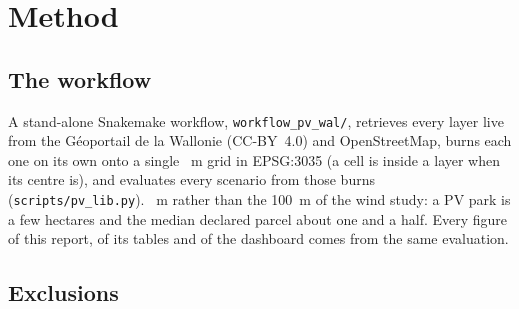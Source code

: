 \documentclass[11pt,a4paper]{article}
\begin{document}
\section{Method}\label{sec:method}

\subsection{The workflow}

A stand-alone Snakemake workflow, \texttt{workflow\_pv\_wal/}, retrieves every
layer live from the Géoportail de la Wallonie (CC-BY~4.0) and OpenStreetMap,
burns each one on its own onto a single \GridRes{}~m grid in EPSG:3035 (a cell
is inside a layer when its centre is), and evaluates every scenario from those
burns (\texttt{scripts/pv\_lib.py}). \GridRes{}~m rather than the 100~m of the
wind study: a PV park is a few hectares and the median declared parcel about
one and a half. Every figure of this report, of its tables and of the dashboard
comes from the same evaluation.

\subsection{Exclusions}
\end{document}
